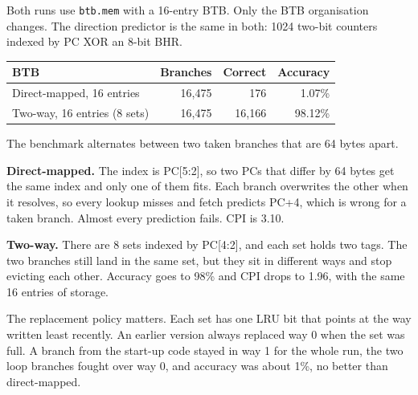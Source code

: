 \documentclass[10pt]{article}
\begin{document}
Both runs use \texttt{btb.mem} with a 16-entry BTB. Only the BTB organisation
changes. The direction predictor is the same in both: 1024 two-bit counters
indexed by PC XOR an 8-bit BHR.

\begin{center}
\begin{tabular}{lrrr}
\toprule
BTB & Branches & Correct & Accuracy \\
\midrule
Direct-mapped, 16 entries   & 16{,}475 & 176 & 1.07\% \\
Two-way, 16 entries (8 sets) & 16{,}475 & 16{,}166 & 98.12\% \\
\bottomrule
\end{tabular}
\end{center}

The benchmark alternates between two taken branches that are 64 bytes apart.

\textbf{Direct-mapped.} The index is PC[5:2], so two PCs that differ by 64
bytes get the same index and only one of them fits. Each branch overwrites
the other when it resolves, so every lookup misses and fetch predicts PC+4,
which is wrong for a taken branch. Almost every prediction fails. CPI is 3.10.

\textbf{Two-way.} There are 8 sets indexed by PC[4:2], and each set holds two
tags. The two branches still land in the same set, but they sit in different
ways and stop evicting each other. Accuracy goes to 98\% and CPI drops to
1.96, with the same 16 entries of storage.

The replacement policy matters. Each set has one LRU bit that points at the
way written least recently. An earlier version always replaced way 0 when
the set was full. A branch from the start-up code stayed in way 1 for the
whole run, the two loop branches fought over way 0, and accuracy was about
1\%, no better than direct-mapped.
\end{document}
